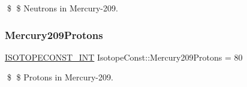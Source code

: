 \$ \$ Neutrons in Mercury-\/209. \mbox{\label{group___isotope_const-_mercury-_hg209_ga9dcb37fda732c6981193935d2e127127}} 
\subsubsection{\texorpdfstring{Mercury209\+Protons}{Mercury209Protons}}
{\footnotesize\ttfamily \mbox{\hyperlink{group___isotope_const-_macros_ga5f18360b3e99483a35c32d789e62621c}{I\+S\+O\+T\+O\+P\+E\+C\+O\+N\+S\+T\+\_\+\+I\+NT}} Isotope\+Const\+::\+Mercury209\+Protons = 80}

\$ \$ Protons in Mercury-\/209. 